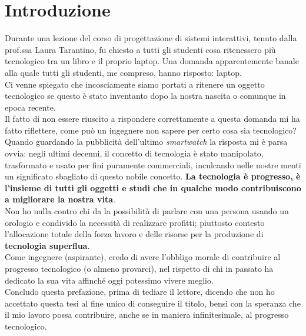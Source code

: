 \chapter*{Introduzione}
\thispagestyle{empty}

Durante una lezione del corso di progettazione di sistemi interattivi, tenuto dalla prof.ssa Laura Tarantino, fu chiesto a tutti gli studenti cosa ritenessero più tecnologico tra un libro e il proprio laptop. Una domanda apparentemente banale alla quale tutti gli studenti, me compreso, hanno risposto: laptop.\\
Ci venne spiegato che incosciamente siamo portati a ritenere un oggetto tecnologico se questo è stato inventanto dopo la nostra nascita o comunque in epoca recente.\\
Il fatto di non essere riuscito a rispondere correttamente a questa domanda mi ha fatto riflettere, come può un ingegnere non sapere per certo cosa sia tecnologico? Quando guardando la pubblicità dell'ultimo \textit{smartwatch} la risposta mi è parsa ovvia: negli ultimi decenni, il concetto di tecnologia è stato manipolato, trasformato e usato per fini puramente commerciali, inculcando nelle nostre menti un significato sbagliato di questo nobile concetto. 
\textbf{La tecnologia è progresso, è l'insieme di tutti gli oggetti e studi che in qualche modo contribuiscono a migliorare la nostra vita}.\\
Non ho nulla contro chi da la possibilità di parlare con una persona usando un orologio e condivido la necessità di realizzare profitti; piuttosto contesto l'allocazione totale della forza lavoro e delle risorse per la produzione di \textbf{tecnologia superflua}.\\
Come ingegnere (aspirante), credo di avere l'obbligo morale di contribuire al progresso tecnologico (o almeno provarci), nel rispetto di chi in passato ha dedicato la sua vita affinché oggi potessimo vivere meglio. \\
Concludo questa prefazione, prima di tediare il lettore, dicendo che non ho accettato questa tesi al fine unico di conseguire il titolo, bensì con la speranza che il mio lavoro possa contribuire, anche se in maniera infinitesimale, al progresso tecnologico.
\newpage

